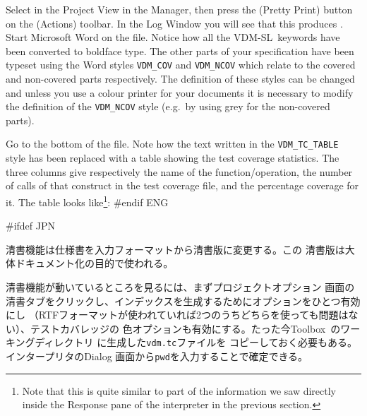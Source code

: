 \documentclass[\pformat,12pt]{article}
\newcommand{\vdmslpp}{VDM-SL}
\newcommand{\Toolbox}{Toolbox}
\newcommand{\vdmslpp}{VDM++}
\newcommand{\Toolbox}{Toolbox}
\newcommand{\guicmd}[1]{{\sf #1}}
\newcommand{\guicmd}[1]{{\gt #1}}
\begin{document}
Select  in the \guicmd{Project View} in the
\guicmd{Manager}, then press the %
(\guicmd{Pretty Print}) button on the
(\guicmd{Actions}) toolbar. In the \guicmd{Log Window} you will
see that this produces . Start Microsoft Word on the
file. Notice how all the \vdmslpp\ keywords have been converted to
boldface type. The
other parts of your specification have been typeset using the Word
styles {\tt VDM\_COV} and {\tt VDM\_NCOV} which relate to the covered
and non-covered parts respectively. The definition of these styles can
be changed and unless you use a colour printer for your documents it
is necessary to modify the definition of the {\tt VDM\_NCOV} style
(e.g.\ by using grey for the non-covered parts).

Go to the bottom of the  file. Note how the
text written in the {\tt VDM\_TC\_TABLE} style has been replaced with a
table showing the test coverage statistics. The three columns give
respectively the name of the function/operation, the number of calls
of that construct in 
the test coverage file, and the percentage coverage for it. The table
looks like\footnote{Note that this is quite similar to part of the
information we saw directly inside the \guicmd{Response} pane of
the interpreter in the previous section.}:
#endif ENG

#ifdef JPN

清書機能は仕様書を入力フォーマットから清書版に変更する。この
清書版は大体ドキュメント化の目的で使われる。
  
清書機能が動いているところを見るには、まず\guicmd{プロジェクトオプション} 画面の
\guicmd{清書}タブをクリックし、インデックスを生成するためにオプションをひとつ有効にし
（RTFフォーマットが使われていれば2つのうちどちらを使っても問題はない）、テストカバレッジの
色オプションも有効にする。たった今\Toolbox\ のワーキングディレクトリ に生成した{\tt vdm.tc}ファイルを
コピーしておく必要もある。インタープリタの\guicmd{Dialog} 画面から{\tt pwd}を入力することで確定できる。
\end{document}
